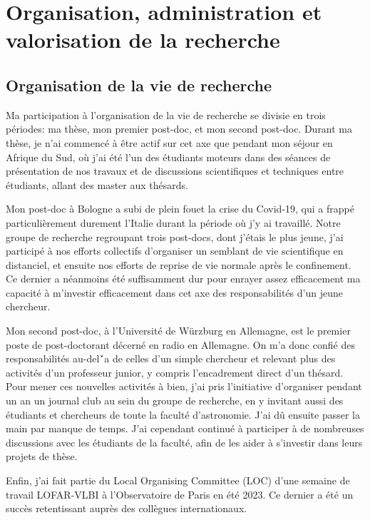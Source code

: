 


\chapter{Organisation, administration et valorisation de la recherche} 

\section{Organisation de la vie de recherche}

\pg
Ma participation \`a l'organisation de la vie de recherche se divisie en trois p\'eriodes: ma th\`ese, mon premier post-doc, et mon second post-doc. Durant ma th\`ese, je n'ai commenc\'e \`a \^etre actif sur cet axe que pendant mon s\'ejour en Afrique du Sud, o\`u j'ai \'et\'e l'un des \'etudiants moteurs dans des s\'eances de pr\'esentation de nos travaux et de discussions scientifiques et techniques entre \'etudiants, allant des master aux th\'esards. 

\pg
Mon post-doc \`a Bologne a subi de plein fouet la crise du Covid-19, qui a frapp\'e particuli\`erement durement l'Italie durant la p\'eriode o\`u j'y ai travaill\'e. Notre groupe de recherche regroupant trois post-docs, dont j'\'etais le plus jeune, j'ai particip\'e \`a nos efforts collectifs d'organiser un semblant de vie scientifique en distanciel, et ensuite nos efforts de reprise de vie normale apr\`es le confinement. Ce dernier a n\'eanmoins \'et\'e suffisamment dur pour enrayer assez efficacement ma capacit\'e \`a m'investir efficacement dans cet axe des responsabilit\'es d'un jeune chercheur.

\pg
Mon second post-doc, \`a l'Universit\'e de W\"urzburg en Allemagne, est le premier poste de post-doctorant d\'ecern\'e en radio en Allemagne. On m'a donc confi\'e des responsabilit\'es au-del\'`a de celles d'un simple chercheur et relevant plus des activit\'es d'un professeur junior, y compris l'encadrement direct d'un th\'esard. Pour mener ces nouvelles activit\'es \`a bien, j'ai pris l'initiative d'organiser pendant un an un journal club au sein du groupe de recherche, en y invitant aussi des \'etudiants et chercheurs de toute la facult\'e d'astronomie. J'ai d\^u ensuite passer la main par manque de temps. J'ai cependant continu\'e \`a participer \`a de nombreuses discussions avec les \'etudiants de la facult\'e, afin de les aider \`a s'investir dans leurs projets de th\`ese.

\pg
Enfin, j'ai fait partie du Local Organising Committee (LOC) d'une semaine de travail LOFAR-VLBI \`a l'Observatoire de Paris en \'et\'e 2023. Ce dernier a \'et\'e un succ\`es retentissant aupr\`es des coll\`egues internationaux.


